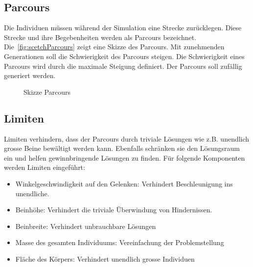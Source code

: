     \subsection{Parcours\label{subsub:parcours}}

      Die Individuen müssen während der Simulation eine Strecke zurücklegen.
      Diese Strecke und ihre Begebenheiten werden als Parcours bezeichnet.
      Die~\vref{fig:scetchParcours} zeigt eine Skizze des Parcours.
      Mit zunehmenden Generationen soll die Schwierigkeit des Parcours steigen.
      Die Schwierigkeit eines Parcours wird durch die maximale Steigung definiert.
      Der Parcours soll zufällig generiert werden.

      \begin{figure}[H]
        
        \caption{Skizze Parcours\label{fig:scetchParcours}}
      \end{figure}

    \subsection{Limiten\label{sub:IntroReqLimit}}

      Limiten verhindern, dass der Parcours durch triviale Lösungen wie z.B. unendlich grosse Beine bewältigt werden kann.
      Ebenfalls schränken sie den Lösungsraum ein und helfen gewinnbringende Lösungen zu finden.
      Für folgende Komponenten werden Limiten eingeführt:

      \begin{itemize}
        \item Winkelgeschwindigkeit auf den Gelenken: Verhindert Beschleunigung ins unendliche.
        \item Beinhöhe: Verhindert die triviale Überwindung von Hindernissen.
        \item Beinbreite: Verhindert unbrauchbare Lösungen
        \item Masse des gesamten Individuums: Vereinfachung der Problemstellung
        \item Fläche des Körpers: Verhindert unendlich grosse Individuen
      \end{itemize}
